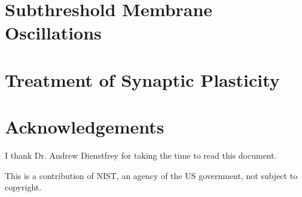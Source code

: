 \documentclass[]{article}
\begin{document}
\section{\label{sec:subthreshold_oscillations}Subthreshold Membrane Oscillations}

\section{\label{sec:synaptic_plasticity}Treatment of Synaptic Plasticity}


\section{Acknowledgements}
I thank Dr. Andrew Dienstfrey for taking the time to read this document.

\vspace{0.5em}
\noindent This is a contribution of NIST, an agency of the US government, not subject to copyright.
	
\newpage
\appendix




\end{document}
